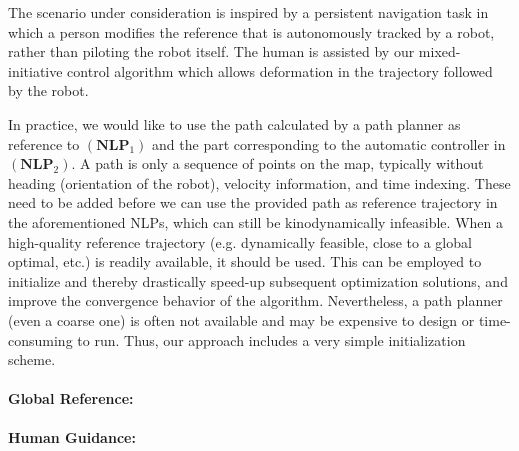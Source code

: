 The scenario under consideration is inspired by a persistent navigation task in which a person modifies the reference that is autonomously tracked by a robot, rather than piloting the robot itself. The human is assisted by our mixed-initiative control algorithm which allows deformation in the trajectory followed by the robot.

In practice, we would like to use the path calculated by a path planner as reference to $(\mathbf{NLP}_1)$ and the part corresponding to the automatic controller in $(\mathbf{NLP}_2)$. A path is only a sequence of points on the map, typically without heading (orientation of the robot), velocity information, and time indexing. These need to be added before we can use the provided path as reference trajectory in the aforementioned NLPs, which can still be kinodynamically infeasible. When a high-quality reference trajectory (e.g. dynamically feasible, close to a global optimal, etc.) is readily available, it should be used. This can be employed to initialize and thereby drastically speed-up subsequent optimization solutions, and improve the convergence behavior of the algorithm. Nevertheless, a path planner (even a coarse one) is often not available and may be expensive to design or time-consuming to run. Thus, our approach includes a very simple initialization scheme.
\paragraph{Global Reference:} 
\paragraph{Human Guidance:} 
